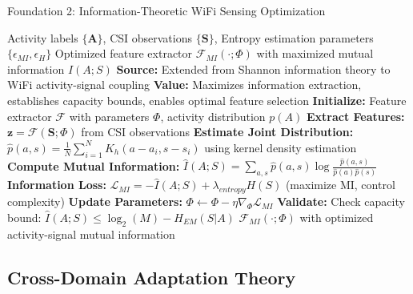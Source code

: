 \documentclass[journal]{IEEEtran}
\begin{document}
\begin{algorithm}[h]
\caption{Foundation 2: Information-Theoretic WiFi Sensing Optimization}
\label{alg:information_foundation}
\begin{algorithmic}[1]
\REQUIRE Activity labels $\{\mathbf{A}\}$, CSI observations $\{\mathbf{S}\}$, Entropy estimation parameters $\{\epsilon_{MI}, \epsilon_{H}\}$
\ENSURE Optimized feature extractor $\mathcal{F}_{MI}(\cdot; \Phi)$ with maximized mutual information $I(A;S)$
\STATE \textbf{Source:} Extended from Shannon information theory \cite{cover1999elements} to WiFi activity-signal coupling
\STATE \textbf{Value:} Maximizes information extraction, establishes capacity bounds, enables optimal feature selection
\STATE \textbf{Initialize:} Feature extractor $\mathcal{F}$ with parameters $\Phi$, activity distribution $p(A)$
\STATE \textbf{Extract Features:} $\mathbf{z} = \mathcal{F}(\mathbf{S}; \Phi)$ from CSI observations
\STATE \textbf{Estimate Joint Distribution:} $\hat{p}(a,s) = \frac{1}{N} \sum_{i=1}^{N} K_h(a - a_i, s - s_i)$ using kernel density estimation
\STATE \textbf{Compute Mutual Information:} $\hat{I}(A;S) = \sum_{a,s} \hat{p}(a,s) \log \frac{\hat{p}(a,s)}{\hat{p}(a)\hat{p}(s)}$
\STATE \textbf{Information Loss:} $\mathcal{L}_{MI} = -\hat{I}(A;S) + \lambda_{entropy} H(S)$ (maximize MI, control complexity)
\STATE \textbf{Update Parameters:} $\Phi \leftarrow \Phi - \eta \nabla_{\Phi} \mathcal{L}_{MI}$
\STATE \textbf{Validate:} Check capacity bound: $\hat{I}(A;S) \leq \log_2(M) - H_{EM}(S|A)$
\RETURN $\mathcal{F}_{MI}(\cdot; \Phi)$ with optimized activity-signal mutual information
\end{algorithmic}
\end{algorithm}

\subsection{Cross-Domain Adaptation Theory}
\end{document}
